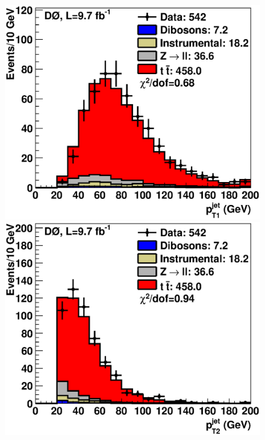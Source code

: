 \documentclass[aps,prd,twocolumn,showpacs,superscriptaddress,groupedaddress,floatfix]{revtex4}
\begin{document}
\begin{figure}[!ht]
\includegraphics[width=\the\unitlength]{h_4.eps}
\includegraphics[width=\the\unitlength]{h_5.eps}


\end{figure}
\end{document}
